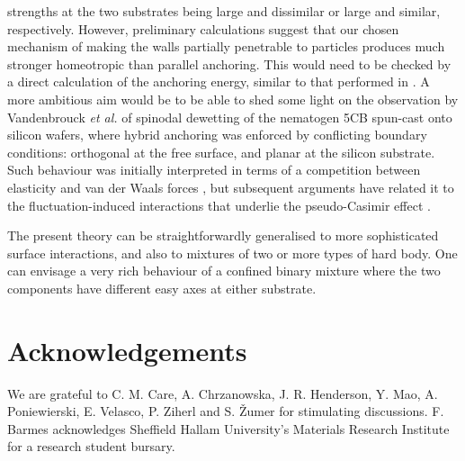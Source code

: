 \documentclass[aps,pre,twocolumn,groupedaddress,showpacs]{revtex4}
\begin{document}
strengths at the two substrates being large and dissimilar or large and 
similar, respectively. However, preliminary calculations
suggest that our chosen mechanism of making the walls partially penetrable
to particles produces much stronger homeotropic than parallel anchoring.
This would need to be checked by a direct calculation of the anchoring 
energy, similar to that performed in \cite{Allen:1999}. A more ambitious 
aim would be to be able to shed some light on the observation by Vandenbrouck 
{\it et al.} \cite{Vanden} of spinodal dewetting of the nematogen 5CB 
spun-cast onto silicon wafers, where hybrid anchoring was enforced by 
conflicting boundary conditions: orthogonal at the free surface, and planar 
at the silicon substrate. Such behaviour was initially interpreted in terms 
of a competition between elasticity and van der Waals forces \cite{Vanden},
but subsequent arguments have related it to the fluctuation-induced 
interactions that underlie the pseudo-Casimir effect \cite{Ziherl}.
\par
The present theory can be straightforwardly generalised to more
sophisticated surface interactions, and also to mixtures of two or  
more types of hard body. One can envisage a very rich behaviour of a 
confined binary mixture where the two components have different easy
axes at either substrate.


\section*{Acknowledgements}

We are grateful to C. M. Care, A. Chrzanowska, J. R. Henderson, Y. Mao, 
A. Poniewierski, E. Velasco, P. Ziherl and S. \v{Z}umer for stimulating 
discussions. F. Barmes acknowledges Sheffield Hallam University's Materials 
Research Institute for a research student bursary.
\end{document}
